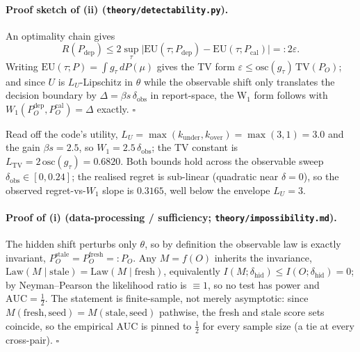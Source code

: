 \paragraph{Proof sketch of (ii) (\texttt{theory/detectability.py}).}
An optimality chain gives
\[
R(P_{\mathrm{dep}})\le 2\sup_\tau\bigl|\mathrm{EU}(\tau;P_{\mathrm{dep}})-\mathrm{EU}(\tau;P_{\mathrm{cal}})\bigr|=:2\varepsilon .
\]
Writing $\mathrm{EU}(\tau;P)=\int g_\tau\,dP(\mu)$
gives the TV form $\varepsilon\le\mathrm{osc}(g_\tau)\,\mathrm{TV}(P_O)$; and since $U$ is
$L_U$-Lipschitz in $\theta$ while the observable shift only translates the decision boundary by
$\Delta=\beta s\,\delta_{\mathrm{obs}}$ in report-space, the W$_1$ form follows with
$W_1(P_O^{\mathrm{dep}},P_O^{\mathrm{cal}})=\Delta$ exactly. \hfill$\square$

Read off the code's utility, $L_U=\max(k_{\mathrm{under}},k_{\mathrm{over}})=\max(3,1)=3.0$ and the
gain $\beta s=2.5$, so $W_1=2.5\,\delta_{\mathrm{obs}}$; the TV constant is
$L_{\mathrm{TV}}=2\,\mathrm{osc}(g_\tau)=0.6820$.
Both bounds hold across the observable sweep $\delta_{\mathrm{obs}}\in[0,0.24]$; the realised regret is
sub-linear (quadratic near $\delta=0$), so the observed regret-vs-$W_1$ slope is $0.3165$, well below
the envelope $L_U=3$.

\paragraph{Proof of (i) (data-processing / sufficiency; \texttt{theory/impossibility.md}).}
The hidden shift perturbs only $\theta$, so by definition the observable law is exactly invariant,
$P_O^{\mathrm{stale}}=P_O^{\mathrm{fresh}}=:P_O$. Any $M=f(O)$ inherits the invariance,
$\mathrm{Law}(M\mid\mathrm{stale})=\mathrm{Law}(M\mid\mathrm{fresh})$, equivalently
$I(M;\delta_{\mathrm{hid}})\le I(O;\delta_{\mathrm{hid}})=0$; by Neyman--Pearson the likelihood ratio
is $\equiv 1$, so no test has power and $\mathrm{AUC}=\tfrac12$. The statement is finite-sample, not
merely asymptotic: since $M(\mathrm{fresh},\mathrm{seed})=M(\mathrm{stale},\mathrm{seed})$ pathwise,
the fresh and stale score sets coincide, so the empirical AUC is pinned to $\tfrac12$ for every sample
size (a tie at every cross-pair). \hfill$\square$

